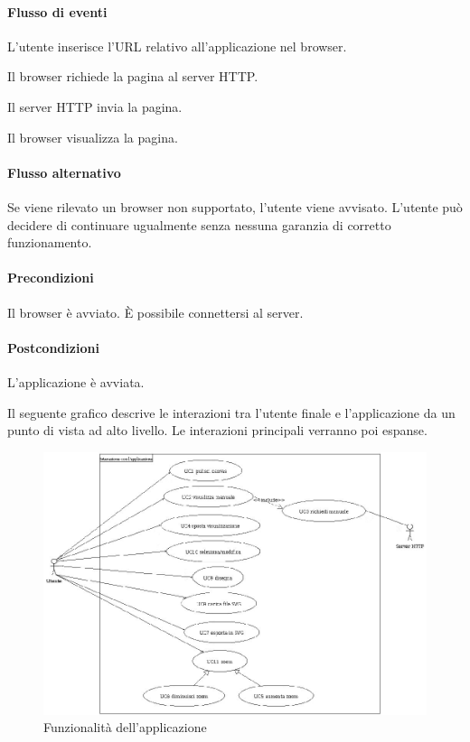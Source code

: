 \paragraph{Flusso di eventi}
\begin{elenconumerato}[\textbf{}]{\subsubsecindent}
\item L'utente inserisce l'URL relativo all'applicazione nel browser.
\item Il browser richiede la pagina al server HTTP.
\item Il server HTTP invia la pagina.
\item Il browser visualizza la pagina.
\end{elenconumerato}
\paragraph{Flusso alternativo}
Se viene rilevato un browser non supportato, l'utente viene avvisato. L'utente pu\`o decidere di continuare ugualmente senza nessuna garanzia di corretto funzionamento.
\paragraph{Precondizioni} Il browser \`e avviato. \`E possibile connettersi al server.
\paragraph{Postcondizioni} L'applicazione \`e avviata.

Il seguente grafico descrive le interazioni tra l'utente finale e l'applicazione da un punto di vista ad alto livello. Le interazioni principali verranno poi espanse.
\begin{figure}[!ht]
\centering
\vspace{20pt} 
\includegraphics{UCInterazione.jpg}
\caption{Funzionalit\`a dell'applicazione}
\end{figure}

